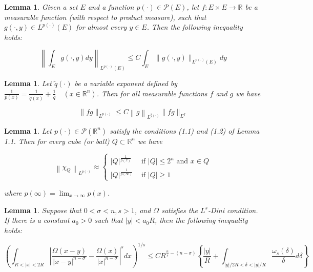 \documentclass[oneside,reqno]{amsart}
\newtheorem{lem}[theorem]{Lemma}
\numberwithin{equation}{section}
\theoremstyle{definition}
\begin{document}
\begin{lem} \cite{uribe1} Given a set $E$ and a function $p(\cdot) \in \mathcal{P}(E)$, let $f: E \times E \rightarrow \mathbb{R}$ be a measurable function (with respect to product measure), such that $g(\cdot, y) \in L^{p(\cdot)}(E)$ for almost every $y \in E$. Then the following inequality holds:

$$
\left\|\int_{E} g(\cdot, y) d y\right\|_{L^{p(\cdot)}(E)} \leq C \int_{E}\|g(\cdot, y)\|_{L^{p(\cdot)}(E)} d y
$$
\end{lem}

\begin{lem}\cite{uribe1} Let $\tilde{q}(\cdot)$ be a variable exponent defined by $\frac{1}{p(x)}=\frac{1}{\tilde{q}(x)}+\frac{1}{q} \quad\left(x \in \mathbb{R}^{n}\right)$. Then for all measurable functions $f$ and $g$ we have

$$
\|f g\|_{L^{p(\cdot)}} \leq C\left\| g\right\|_{L^{\bar{q}(\cdot)}}\|f g\|_{L^{q}}
$$
\end{lem}

\begin{lem}\cite{ref6} Let $p(\cdot) \in \mathcal{P}\left(\mathbb{R}^{n}\right)$ satisfy the conditions (1.1) and (1.2) of Lemma 1.1. Then for every cube (or ball) $Q \subset \mathbb{R}^{n}$ we have

$$
\left\|\chi_{Q}\right\|_{L^{p(\cdot)}} \approx \begin{cases}|Q|^{\frac{1}{p(x)}} & \text { if }|Q| \leq 2^{n} \text { and } x \in Q \\ |Q|^{\frac{1}{p(\infty)}} & \text { if }|Q| \geq 1\end{cases}
$$

where $p(\infty)=\lim _{x \rightarrow \infty} p(x)$.
\end{lem}
\begin{lem} \cite{ding1} Suppose that $0<\sigma<n, s>1$, and $\Omega$ satisfies the $L^{s}$-Dini condition. If there is a constant $a_{0}>0$ such that $|y|<a_{0} R$, then the following inequality holds:

$$
\left(\int_{R<|x|<2 R}\left|\frac{\Omega(x-y)}{|x-y|^{n-\sigma}}-\frac{\Omega(x)}{|x|^{n-\sigma}}\right|^{s} d x\right)^{1 / s} \leq C R^{\frac{n}{s}-(n-\sigma)}\left\{\frac{|y|}{R}+\int_{|y| / 2 R<\delta<|y| / R} \frac{\omega_{s}(\delta)}{\delta} d \delta\right\}
$$
\end{lem}
\end{document}
